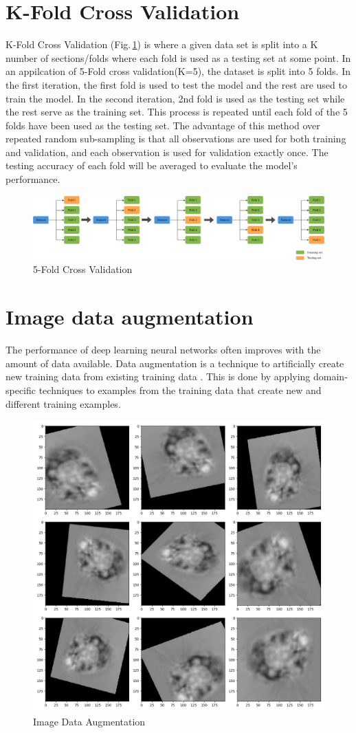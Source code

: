 \section{K-Fold Cross Validation}
K-Fold Cross Validation \citep{Kohavi95astudy} (Fig.\,\ref{kfold}) is where a given data set is split into a K number of sections/folds where each fold is used as a testing set at some point. In an appilcation of 5-Fold cross validation(K=5), the dataset is split into 5 folds. In the first iteration, the first fold is used to test the model and the rest are used to train the model. In the second iteration, 2nd fold is used as the testing set while the rest serve as the training set. This process is repeated until each fold of the 5 folds have been used as the testing set. The advantage of this method over repeated random sub-sampling is that all observations are used for both training and validation, and each observation is used for validation exactly once. The testing accuracy of each fold will be averaged to evaluate the model's performance. 

\begin{figure}[h]
	\centering
	\includegraphics[width=\textwidth]{Figs/kfold.png}
    \caption{5-Fold Cross Validation}
    \label{kfold}
\end{figure}


\section{Image data augmentation}

The performance of deep learning neural networks often improves with the amount of data available. Data augmentation is a technique to artificially create new training data from existing training data \citep{Mikolajczyk2018}. This is done by applying domain-specific techniques to examples from the training data that create new and different training examples.

\begin{figure}[h]
	\centering
	\includegraphics[width=.5\textwidth]{Figs/dataaug.jpg}
    \caption{Image Data Augmentation}
    \label{dataaug}
\end{figure}

